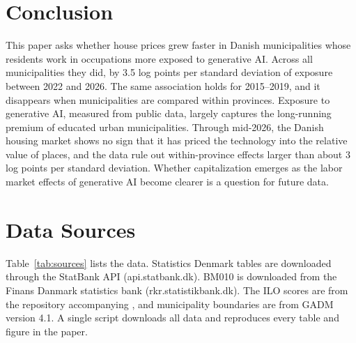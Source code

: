 \documentclass[12pt]{article}
\begin{document}
\section{Conclusion}\label{sec:conclusion}

This paper asks whether house prices grew faster in Danish municipalities whose residents work in occupations more exposed to generative AI. Across all municipalities they did, by 3.5 log points per standard deviation of exposure between 2022 and 2026. The same association holds for 2015--2019, and it disappears when municipalities are compared within provinces. Exposure to generative AI, measured from public data, largely captures the long-running premium of educated urban municipalities. Through mid-2026, the Danish housing market shows no sign that it has priced the technology into the relative value of places, and the data rule out within-province effects larger than about 3 log points per standard deviation. Whether capitalization emerges as the labor market effects of generative AI become clearer is a question for future data.

\newpage



\newpage
\appendix

\section{Data Sources}\label{app:data}

Table~\ref{tab:sources} lists the data. Statistics Denmark tables are downloaded through the StatBank API (api.statbank.dk). BM010 is downloaded from the Finans Danmark statistics bank (rkr.statistikbank.dk). The ILO scores are from the repository accompanying \citet{gmyrek2025}, and municipality boundaries are from GADM version 4.1. A single script downloads all data and reproduces every table and figure in the paper.
\end{document}
